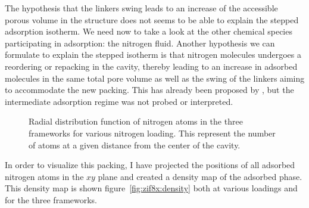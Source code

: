 \documentclass[thesis]{subfiles}
\begin{document}
The hypothesis that the linkers swing leads to an increase of the accessible
porous volume in the structure does not seems to be able to explain the stepped
adsorption isotherm. We need now to take a look at the other chemical species
participating in adsorption: the nitrogen fluid. Another hypothesis we can
formulate to explain the stepped isotherm is that nitrogen molecules undergoes a
reordering or repacking in the cavity, thereby leading to an increase in
adsorbed molecules in the same total pore volume as well as the swing of the
linkers aiming to accommodate the new packing. This has already been proposed by
\citeauthor{Ania2012}\cite{Ania2012}, but the intermediate adsorption regime was
not probed or interpreted.

\begin{figure}[t]
    \centering
    
    \caption{Radial distribution function of nitrogen atoms in the three
    frameworks for various nitrogen loading. This represent the number of atoms
    at a given distance from the center of the cavity.}
    \label{fig:zif8x:rdf}
\end{figure}

In order to visualize this packing, I have projected the positions of all
adsorbed nitrogen atoms in the $xy$ plane and created a density map of the
adsorbed phase. This density map is shown figure~\ref{fig:zif8x:density} both at
various loadings and for the three frameworks.
\end{document}
